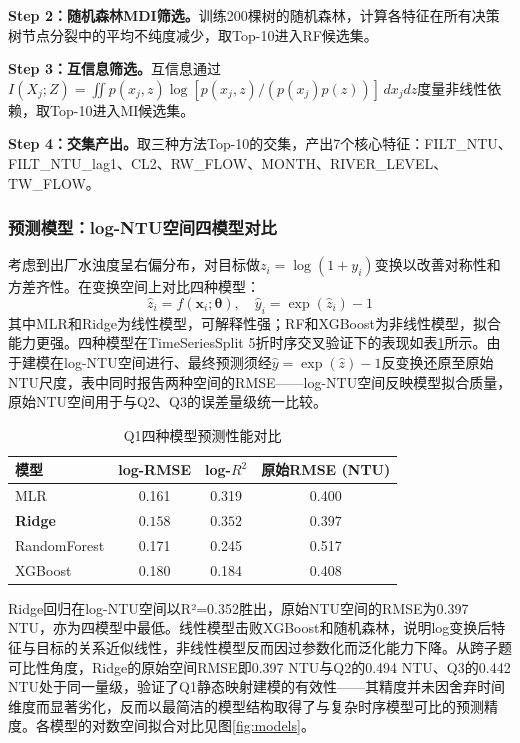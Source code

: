 \documentclass{cumcmthesis}
\begin{document}
\textbf{Step 2：随机森林MDI筛选。}训练200棵树的随机森林，计算各特征在所有决策树节点分裂中的平均不纯度减少，取Top-10进入RF候选集。

\textbf{Step 3：互信息筛选。}互信息通过$I(X_j; Z) = \iint p(x_j, z)\log[p(x_j, z)/(p(x_j)p(z))]\,dx_j dz$度量非线性依赖，取Top-10进入MI候选集。

\textbf{Step 4：交集产出。}取三种方法Top-10的交集，产出7个核心特征：FILT\_NTU、FILT\_NTU\_lag1、CL2、RW\_FLOW、MONTH、RIVER\_LEVEL、TW\_FLOW。

\subsubsection{预测模型：log-NTU空间四模型对比}
考虑到出厂水浊度呈右偏分布，对目标做$z_i=\log(1+y_i)$变换以改善对称性和方差齐性。在变换空间上对比四种模型：
\begin{equation}
\hat{z}_i = f(\mathbf{x}_i;\boldsymbol{\theta}), \quad \hat{y}_i = \exp(\hat{z}_i) - 1
\end{equation}
其中MLR和Ridge为线性模型，可解释性强；RF和XGBoost为非线性模型，拟合能力更强。四种模型在TimeSeriesSplit 5折时序交叉验证下的表现如表\ref{tab:q1_models}所示。由于建模在log-NTU空间进行、最终预测须经$\hat{y}=\exp(\hat{z})-1$反变换还原至原始NTU尺度，表中同时报告两种空间的RMSE——log-NTU空间反映模型拟合质量，原始NTU空间用于与Q2、Q3的误差量级统一比较。

\begin{table}[H]
\centering
\caption{Q1四种模型预测性能对比}
\label{tab:q1_models}
\begin{tabular}{@{}lccc@{}}
\toprule
模型 & log-RMSE & log-$R^2$ & 原始RMSE (NTU) \\
\midrule
MLR & 0.161 & 0.319 & 0.400 \\
\textbf{Ridge} & $\mathbf{0.158}$ & $\mathbf{0.352}$ & $\mathbf{0.397}$ \\
RandomForest & 0.171 & 0.245 & 0.517 \\
XGBoost & 0.180 & 0.184 & 0.408 \\
\bottomrule
\end{tabular}
\end{table}

Ridge回归在log-NTU空间以R²=0.352胜出，原始NTU空间的RMSE为0.397 NTU，亦为四模型中最低。线性模型击败XGBoost和随机森林，说明log变换后特征与目标的关系近似线性，非线性模型反而因过参数化而泛化能力下降。从跨子题可比性角度，Ridge的原始空间RMSE即0.397 NTU与Q2的0.494 NTU、Q3的0.442 NTU处于同一量级，验证了Q1静态映射建模的有效性——其精度并未因舍弃时间维度而显著劣化，反而以最简洁的模型结构取得了与复杂时序模型可比的预测精度。各模型的对数空间拟合对比见图\ref{fig:models}。
\end{document}
